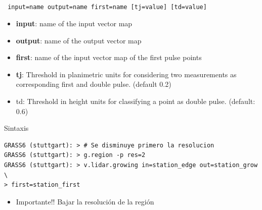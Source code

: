 \subsection{}
\begin{frame}[fragile,shrink=10]
  \frametitle{}
  \begin{beamerboxesrounded}[shadow=true]{\textbf{}
    \texttt{ input=name output=name first=name [tj=value] [td=value]}}
    \begin{itemize}
     \item \textbf{input}: name of the input vector map
     \item \textbf{output}: name of the output vector map
     \item \textbf{first}: name of the input vector map of the first pulse points
     \item \textbf{tj}: Threshold in planimetric units for considering two 
         measurements as corresponding first and double pulse. (default 0.2)
     \item td: Threshold in height units for classifying a point as double pulse. 
         (default: 0.6)
    \end{itemize}
  \end{beamerboxesrounded}
  \begin{beamerboxesrounded}[shadow=true]{Sintaxis}
\scriptsize
\begin{verbatim}
GRASS6 (stuttgart): > # Se disminuye primero la resolucion
GRASS6 (stuttgart): > g.region -p res=2
GRASS6 (stuttgart): > v.lidar.growing in=station_edge out=station_grow \
> first=station_first
\end{verbatim}
\end{beamerboxesrounded}
\begin{itemize}
 \item \alert{Importante!!} Bajar la resolución de la región
\end{itemize}
\end{frame}
\pgfdeclareimage[width=0.65\textwidth]{grow}{images/grow}
